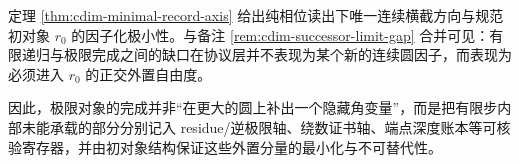 \begin{remark}[后继--极限断层在协议层的正交外置]\label{rem:cdim-gap-orthogonal-externalization}
定理 \ref{thm:cdim-minimal-record-axis} 给出纯相位读出下唯一连续横截方向与规范初对象 \(r_0\) 的因子化极小性。与备注 \ref{rem:cdim-successor-limit-gap} 合并可见：有限递归与极限完成之间的缺口在协议层并不表现为某个新的连续圆因子，而表现为必须进入 \(r_0\) 的正交外置自由度。
\par
因此，极限对象的完成并非“在更大的圆上补出一个隐藏角变量”，而是把有限步内部未能承载的部分分别记入 residue/逆极限轴、绕数证书轴、端点深度账本等可核验寄存器，并由初对象结构保证这些外置分量的最小化与不可替代性。
\end{remark}
